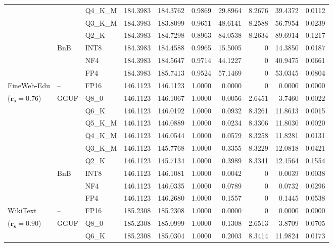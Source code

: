 \begin{table}[t]
{\begin{tabular}{ll l rrrrrrr}
 &  & Q4\_K\_M & 184.3983 & 184.3762 & 0.9869 & 29.8964 & 8.2676 & 39.4372 & 0.0112 \\
 &  & Q3\_K\_M & 184.3983 & 183.8099 & 0.9651 & 48.6141 & 8.2588 & 56.7954 & 0.0239 \\
 &  & Q2\_K & 184.3983 & 184.7298 & \cellcolor{red!18} 0.8963 & \cellcolor{red!18} 84.0538 & 8.2634 & \cellcolor{red!18} 89.6914 & \cellcolor{red!18} 0.1217 \\
 & BnB & INT8 & 184.3983 & 184.4588 & 0.9965 & 15.5005 & \cellcolor{cyan!12} $0$ & 14.3850 & 0.0187 \\
 &  & NF4 & 184.3983 & 184.5647 & 0.9714 & 44.1227 & \cellcolor{cyan!12} $0$ & 40.9475 & 0.0661 \\
 &  & FP4 & 184.3983 & 185.7413 & 0.9524 & 57.1469 & \cellcolor{cyan!12} $0$ & 53.0345 & 0.0804 \\
\midrule
FineWeb-Edu & -- & FP16 & 146.1123 & 146.1123 & 1.0000 & 0.0000 & \cellcolor{cyan!12} $0$ & 0.0000 & 0.0000 \\
{\small ($\mathbf{r_s{=}0.76}$)} & GGUF & Q8\_0 & 146.1123 & 146.1067 & 1.0000 & 0.0056 & 2.6451 & 3.7460 & 0.0022 \\
 &  & Q6\_K & 146.1123 & 146.0192 & 1.0000 & 0.0932 & 8.3261 & 11.8613 & 0.0015 \\
 &  & Q5\_K\_M & 146.1123 & 146.0889 & 1.0000 & 0.0234 & 8.3306 & 11.8030 & 0.0020 \\
 &  & Q4\_K\_M & 146.1123 & 146.0544 & 1.0000 & 0.0579 & 8.3258 & 11.8281 & 0.0131 \\
 &  & Q3\_K\_M & 146.1123 & 145.7768 & 1.0000 & 0.3355 & 8.3229 & 12.0818 & 0.0421 \\
 &  & Q2\_K & 146.1123 & 145.7134 & 1.0000 & 0.3989 & 8.3341 & 12.1564 & 0.1554 \\
 & BnB & INT8 & 146.1123 & 146.1081 & 1.0000 & 0.0042 & \cellcolor{cyan!12} $0$ & 0.0039 & 0.0038 \\
 &  & NF4 & 146.1123 & 146.0335 & 1.0000 & 0.0789 & \cellcolor{cyan!12} $0$ & 0.0732 & 0.0296 \\
 &  & FP4 & 146.1123 & 146.2680 & 1.0000 & 0.1557 & \cellcolor{cyan!12} $0$ & 0.1445 & 0.0538 \\
\midrule
WikiText & -- & FP16 & 185.2308 & 185.2308 & 1.0000 & 0.0000 & \cellcolor{cyan!12} $0$ & 0.0000 & 0.0000 \\
{\small ($\mathbf{r_s{=}0.90}$)} & GGUF & Q8\_0 & 185.2308 & 185.0999 & 1.0000 & 0.1308 & 2.6513 & 3.8709 & 0.0705 \\
 &  & Q6\_K & 185.2308 & 185.0304 & 1.0000 & 0.2003 & 8.3414 & 11.9824 & 0.0173 \\

\end{tabular}}
\end{table}
